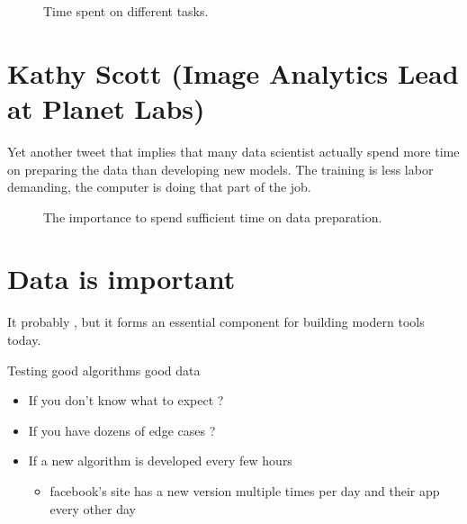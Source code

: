 \documentclass[letterpaper,10pt,english]{sphinxmanual}
\begin{document}
\begin{figure}[htbp]
\centering
\capstart

\noindent{}
\caption{Time spent on different tasks.}\label{\detokenize{03-Datasets:id4}}\end{figure}




\section{Kathy Scott (Image Analytics Lead at Planet Labs)}
\label{\detokenize{03-Datasets:kathy-scott-image-analytics-lead-at-planet-labs}}
\sphinxAtStartPar
Yet another tweet that implies that many data scientist actually spend more time on preparing the data than developing new models.  The training is less labor demanding, the computer is doing that part of the job.

\begin{figure}[htbp]
\centering
\capstart

\noindent{}
\caption{The importance to spend sufficient time on data preparation.}\label{\detokenize{03-Datasets:id5}}\end{figure}




\section{Data is important}
\label{\detokenize{03-Datasets:data-is-important}}
\sphinxAtStartPar
It probably , but it forms an essential component for building modern tools today.

\sphinxAtStartPar
Testing good algorithms  good data
\begin{itemize}
\item {} 
\sphinxAtStartPar
If you don’t know what to expect \sphinxhyphen{} ?

\item {} 
\sphinxAtStartPar
If you have dozens of edge cases \sphinxhyphen{} ?

\item {} 
\sphinxAtStartPar
If a new algorithm is developed every few hours \sphinxhyphen{} 
\begin{itemize}
\item {} 
\sphinxAtStartPar
facebook’s site has a new version multiple times per day and their app every other day

\end{itemize}

\end{itemize}
\end{document}
